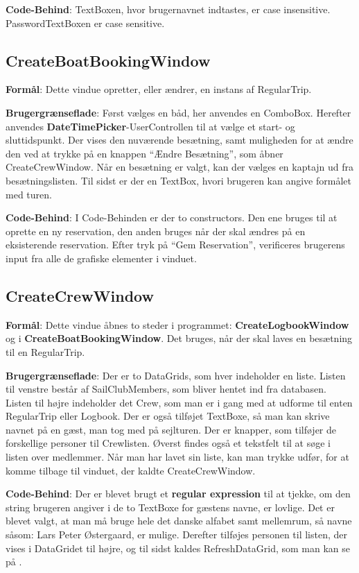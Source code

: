 \textbf{Code-Behind}: 
TextBoxen, hvor brugernavnet indtastes, er case insensitive.
PasswordTextBoxen er case sensitive. 

\subsection{CreateBoatBookingWindow}
\textbf{Formål}: 
Dette vindue opretter, eller ændrer, en instans af RegularTrip.

\textbf{Brugergrænseflade}: 
Først vælges en båd, her anvendes en ComboBox.
Herefter anvendes \textbf{DateTimePicker}-UserControllen til at vælge et start- og sluttidspunkt.
Der vises den nuværende besætning, samt muligheden for at ændre den ved at trykke på en knappen ``Ændre Besætning'', som åbner CreateCrewWindow.
Når en besætning er valgt, kan der vælges en kaptajn ud fra besætningslisten.
Til sidst er der en TextBox, hvori brugeren kan angive formålet med turen.

\textbf{Code-Behind}: 
I Code-Behinden er der to constructors. 
Den ene bruges til at oprette en ny reservation, den anden bruges når der skal ændres på en eksisterende reservation. 
Efter tryk på ``Gem Reservation'', verificeres brugerens input fra alle de grafiske elementer i vinduet.

\subsection{CreateCrewWindow}

\textbf{Formål}: Dette vindue åbnes to steder i programmet: \textbf{CreateLogbookWindow} og i \textbf{CreateBoatBookingWindow}. 
Det bruges, når der skal laves en besætning til en RegularTrip.  

\textbf{Brugergrænseflade}: 
Der er to DataGrids, som hver indeholder en liste. 
Listen til venstre består af SailClubMembers, som bliver hentet ind fra databasen. 
Listen til højre indeholder det Crew, som man er i gang med at udforme til enten RegularTrip eller Logbook. 
Der er også tilføjet TextBoxe, så man kan skrive navnet på en gæst, man tog med på sejlturen. 
Der er knapper, som tilføjer de forskellige personer til Crewlisten. 
Øverst findes også et tekstfelt til at søge i listen over medlemmer. 
Når man har lavet sin liste, kan man trykke udfør, for at komme tilbage til vinduet, der kaldte CreateCrewWindow.

\textbf{Code-Behind}: 
Der er blevet brugt et \textbf{regular expression} til at tjekke, om den string brugeren angiver i de to TextBoxe for gæstens navne, er lovlige. 
Det er blevet valgt, at man må bruge hele det danske alfabet samt mellemrum, så navne såsom: Lars Peter Østergaard, er mulige.
Derefter tilføjes personen til listen, der vises i DataGridet til højre, og til sidst kaldes RefreshDataGrid, som man kan se på .

